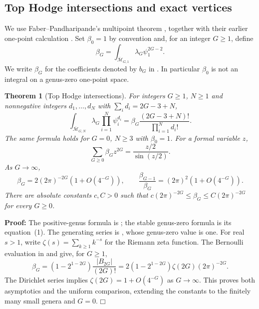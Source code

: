 \documentclass[a4paper,10pt]{article}
\numberwithin{equation}{section}
\newcommand{\MM}{\overline{\mathcal{M}}}
\theoremstyle{paperplain}
\newtheorem{thm}{Theorem}[section]
\theoremstyle{paperremark}
\theoremstyle{paperplain}
\newenvironment{prf}{\noindent \textbf{Proof: }}{\hfill $\mdlgwhtsquare$\par\addvspace{0.5\baselineskip}}
\begin{document}
\subsection{Top Hodge intersections and exact vertices}
\label{subsec:s06:01}

We use Faber--Pandharipande's multipoint theorem
\cite[Theorem~1]{FP03}, together with their earlier one-point
calculation \cite[Theorem~2, (6)]{FP00}. Set $\beta_0=1$ by
convention and, for an integer $G\geq1$, define
\begin{equation}\label{eq:s06:beta-definition}
 \beta_G=\int_{\MM_{G,1}}\lambda_G\psi_1^{2G-2}.
\end{equation}
We write $\beta_G$ for the coefficients denoted by $b_G$ in
\cite[(3), (6)]{FP00}.
In particular $\beta_0$ is not an integral on a genus-zero one-point
space.

\begin{thm}[Top Hodge intersections]\label{thm:s06:lambda-g}
For integers $G\geq1$, $N\geq1$ and nonnegative integers
$d_1,\ldots,d_N$ with $\sum_i d_i=2G-3+N$,
\begin{equation}\label{eq:s06:lambda-g}
 \int_{\MM_{G,N}}\lambda_G\prod_{i=1}^N\psi_i^{d_i}
 =\beta_G\frac{(2G-3+N)!}{\prod_{i=1}^N d_i!}.
\end{equation}
The same formula holds for $G=0$, $N\geq3$ with $\beta_0=1$.
For a formal variable $z$,
\begin{equation}\label{eq:s06:beta-series}
 \sum_{G\geq0}\beta_Gz^{2G}=\frac{z/2}{\sin(z/2)}.
\end{equation}
As $G\to\infty$,
\begin{equation}\label{eq:s06:beta-asymptotics}
 \beta_G=2(2\pi)^{-2G}(1+O(4^{-G})),\qquad
 \frac{\beta_{G-1}}{\beta_G}=(2\pi)^2(1+O(4^{-G})).
\end{equation}
There are absolute constants $c,C>0$ such that
$c(2\pi)^{-2G}\leq\beta_G\leq C(2\pi)^{-2G}$ for every $G\geq0$.
\end{thm}
\begin{prf}
The positive-genus formula is \cite[Theorem~1]{FP03}; the
stable genus-zero formula is its equation~(1). The generating
series is \cite[Theorem~2, (6)]{FP00}, whose genus-zero value is
one. For real $s>1$, write
$\zeta(s)=\sum_{k\geq1}k^{-s}$ for the Riemann zeta function.
The Bernoulli evaluation in \cite[\S 4.2, Lemma~1]{FP00}
and \cite[(25.6.2)]{DLMF} give, for $G\geq1$,
\[
 \beta_G=(1-2^{1-2G})\frac{|B_{2G}|}{(2G)!}
       =2(1-2^{1-2G})\zeta(2G)(2\pi)^{-2G}.
\]
The Dirichlet series \cite[(25.2.1)]{DLMF} implies
$\zeta(2G)=1+O(4^{-G})$ as $G\to\infty$.
This proves both asymptotics and the uniform comparison, extending
the constants to the finitely many small genera and $G=0$.
\end{prf}
\end{document}
